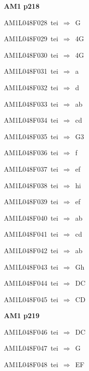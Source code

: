 \par\vfill\eject
{\bf\hfill AM1 p218\hfill\hbox{}}\par\bigskip
{\sixrm AM1L048F028\ {\sixit tei}\ }$\Rightarrow$\ G\par\smallskip
{\sixrm AM1L048F029\ {\sixit tei}\ }$\Rightarrow$\ 4G\par\smallskip
{\sixrm AM1L048F030\ {\sixit tei}\ }$\Rightarrow$\ 4G\par\smallskip
{\sixrm AM1L048F031\ {\sixit tei}\ }$\Rightarrow$\ {\tenit a}\par\smallskip
{\sixrm AM1L048F032\ {\sixit tei}\ }$\Rightarrow$\ {\tenit d}\par\smallskip
{\sixrm AM1L048F033\ {\sixit tei}\ }$\Rightarrow$\ {\tenit ab}\par\smallskip
{\sixrm AM1L048F034\ {\sixit tei}\ }$\Rightarrow$\ {\tenit cd}\par\smallskip
{\sixrm AM1L048F035\ {\sixit tei}\ }$\Rightarrow$\ G3\par\smallskip
{\sixrm AM1L048F036\ {\sixit tei}\ }$\Rightarrow$\ {\tenit f}\par\smallskip
{\sixrm AM1L048F037\ {\sixit tei}\ }$\Rightarrow$\ {\tenit ef}\par\smallskip
{\sixrm AM1L048F038\ {\sixit tei}\ }$\Rightarrow$\ {\tenit hi}\par\smallskip
{\sixrm AM1L048F039\ {\sixit tei}\ }$\Rightarrow$\ {\tenit ef}\par\smallskip
{\sixrm AM1L048F040\ {\sixit tei}\ }$\Rightarrow$\ {\tenit ab}\par\smallskip
{\sixrm AM1L048F041\ {\sixit tei}\ }$\Rightarrow$\ {\tenit cd}\par\smallskip
{\sixrm AM1L048F042\ {\sixit tei}\ }$\Rightarrow$\ {\tenit ab}\par\smallskip
{\sixrm AM1L048F043\ {\sixit tei}\ }$\Rightarrow$\ G{\tenit h}\par\smallskip
{\sixrm AM1L048F044\ {\sixit tei}\ }$\Rightarrow$\ DC\par\smallskip
{\sixrm AM1L048F045\ {\sixit tei}\ }$\Rightarrow$\ CD\par\smallskip

\par\vfill\eject
{\bf\hfill AM1 p219\hfill\hbox{}}\par\bigskip
{\sixrm AM1L048F046\ {\sixit tei}\ }$\Rightarrow$\ DC\par\smallskip
{\sixrm AM1L048F047\ {\sixit tei}\ }$\Rightarrow$\ G\par\smallskip
{\sixrm AM1L048F048\ {\sixit tei}\ }$\Rightarrow$\ EF\par\smallskip


